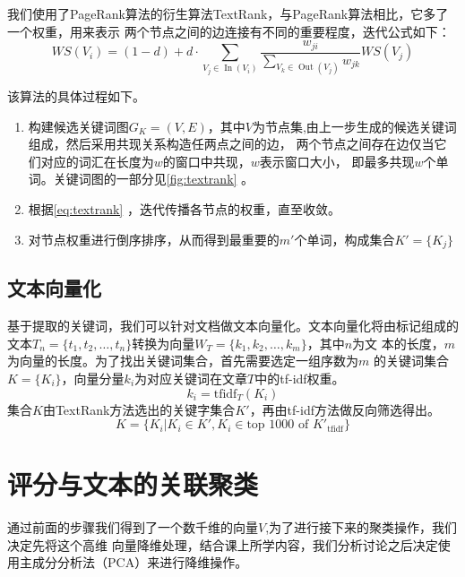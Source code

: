 我们使用了PageRank算法的衍生算法TextRank，与PageRank算法相比，它多了一个权重，用来表示
两个节点之间的边连接有不同的重要程度，迭代公式如下：
\begin{equation}\label{eq:textrank}
    W S\left(V_{i}\right)=(1-d)+d \cdot \sum_{V_{j} \in
    \operatorname{In}\left(V_{i}\right)} \frac{w_{j i}}{\sum_{V_{k} \in
\operatorname{Out}\left(V_{j}\right)} w_{j k}} W S\left(V_{j}\right)
\end{equation}

该算法的具体过程如下。
\begin{enumerate}
    \item 构建候选关键词图$G_K = (V,E)$，其中$V$为节点集,由上一步生成的候选关键词组成，然后采用共现关系构造任两点之间的边，
    两个节点之间存在边仅当它们对应的词汇在长度为$w$的窗口中共现，$w$表示窗口大小，
    即最多共现$w$个单词。关键词图的一部分见\autoref{fig:textrank} 。
    \item 根据\autoref{eq:textrank} ，迭代传播各节点的权重，直至收敛。
    \item 对节点权重进行倒序排序，从而得到最重要的$m'$个单词，构成集合$K'=\{K_j\}$
\end{enumerate}






\subsection{文本向量化}

基于提取的关键词，我们可以针对文档做文本向量化。文本向量化将由标记组成的
文本$T_n=\{t_1,t_2,\ldots,t_n\}$转换为向量$W_T=\{k_1,k_2,\ldots,k_m\}$，其中$n$为文
本的长度，$m$为向量的长度。为了找出关键词集合，首先需要选定一组序数为$m$
的关键词集合$K=\{K_i\}$，向量分量$k_i$为对应关键词在文章$T$中的tf-idf权重。
\begin{equation}
    k_i = \textrm{tfidf}_T(K_i)
\end{equation}
集合$K$由TextRank方法选出的关键字集合$K'$，再由tf-idf方法做反向筛选得出。
\begin{equation}
    K = \{K_i | K_i \in K', K_i \in \textrm{top 1000 of }K'_{\textrm{tfidf}} \}
\end{equation}

\section{评分与文本的关联聚类}
通过前面的步骤我们得到了一个数千维的向量$V$,为了进行接下来的聚类操作，我们决定先将这个高维
向量降维处理，结合课上所学内容，我们分析讨论之后决定使用主成分分析法（PCA）来进行降维操作。

